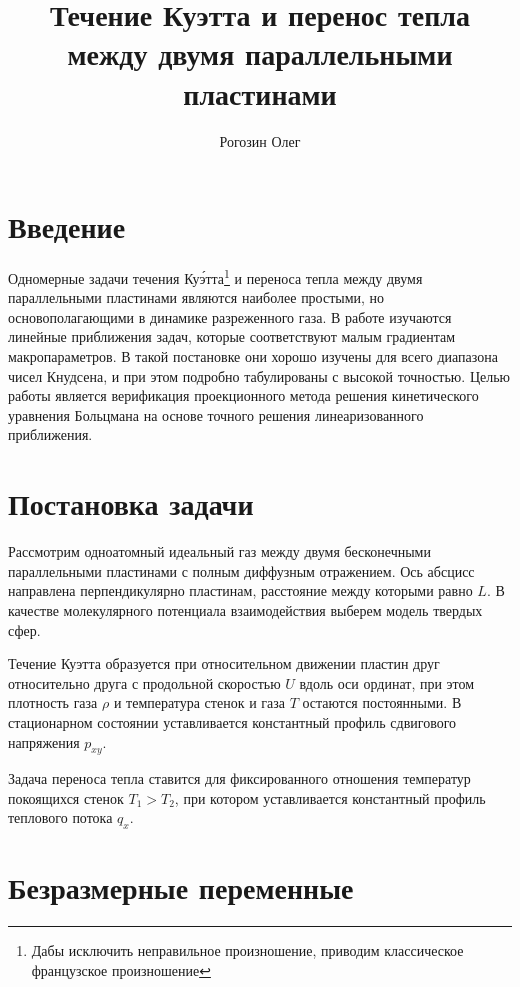 \documentclass[a4paper,12pt]{article}
\title{Течение Куэтта и перенос тепла между двумя параллельными пластинами}
\author{Рогозин Олег}
\begin{document}
\maketitle
\tableofcontents

\section{Введение}

Одномерные задачи течения Ку\'{э}тта\footnote
{
	Дабы исключить неправильное произношение, приводим классическое французское произношение
}
и переноса тепла между двумя параллельными пластинами являются наиболее простыми,
но основополагающими в динамике разреженного газа. В работе изучаются линейные приближения задач,
которые соответствуют малым градиентам макропараметров. В такой постановке они хорошо изучены
для всего диапазона чисел Кнудсена, и при этом подробно табулированы с высокой точностью.
Целью работы является верификация проекционного метода решения кинетического уравнения Больцмана
на основе точного решения линеаризованного приближения.

\section{Постановка задачи}

Рассмотрим одноатомный идеальный газ между двумя бесконечными параллельными пластинами с полным диффузным отражением.
Ось абсцисс направлена перпендикулярно пластинам, расстояние между которыми равно \(L\).
В качестве молекулярного потенциала взаимодействия выберем модель твердых сфер.

Течение Куэтта образуется при  относительном движении пластин друг относительно друга с продольной скоростью \(U\)
вдоль оси ординат, при этом плотность газа \(\rho\) и температура стенок и газа \(T\) остаются постоянными.
В стационарном состоянии уставливается константный профиль сдвигового напряжения \(p_{xy}\).

Задача переноса тепла ставится для фиксированного отношения температур покоящихся стенок \(T_1>T_2\),
при котором уставливается константный профиль теплового потока \(q_x\).

\section{Безразмерные переменные}
\end{document}
